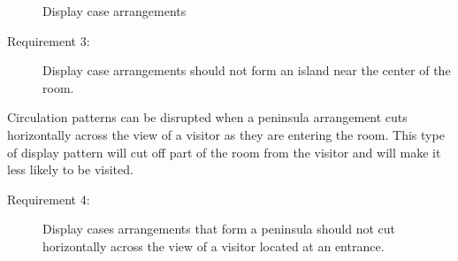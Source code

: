 \documentclass[12pt]{ucthesis}
\begin{document}
   \begin{figure}[H]
 \centering
 \hspace{10 mm}
  \hspace{10 mm}
 \caption{Display case arrangements}
\label{display-arrangement}
\end{figure}
 
\begin{description}
\item[Requirement 3:] Display case arrangements should not form an island near the center of the room.
\end{description} 

Circulation patterns can be disrupted when a peninsula arrangement cuts horizontally across the view of a visitor as they are entering the room. This type of display pattern will cut off part of the room from the visitor and will make it less likely to be visited.

\begin{description}
\item[Requirement 4:] Display cases arrangements that form a peninsula should not cut horizontally across the view of a visitor located at an entrance.
\end{description} 
\end{document}
